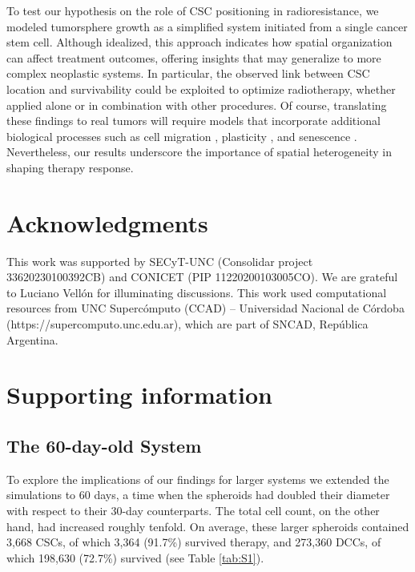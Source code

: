 \documentclass[10pt,letterpaper]{article}
\begin{document}
To test our hypothesis on the role of CSC positioning in radioresistance, we modeled tumorsphere growth as a simplified system initiated from a single cancer stem cell. Although idealized, this approach indicates how spatial organization can affect treatment outcomes, offering insights that may generalize to more complex neoplastic systems. In particular, the observed link between CSC location and survivability could be exploited to optimize radiotherapy, whether applied alone or in combination with other procedures. Of course, translating these findings to real tumors will require models that incorporate additional biological processes such as cell migration \cite{friedl2010}, plasticity \cite{schniewind2022, meacham2013}, and senescence \cite{gao2013, childs2014}. Nevertheless, our results underscore the importance of spatial heterogeneity \cite{junttila2013, tonello2025} in shaping therapy response.



\section*{Acknowledgments}

This work was supported by SECyT-UNC (Consolidar project 33620230100392CB) and CONICET (PIP 11220200103005CO). We are grateful to Luciano Vellón for illuminating discussions.
This work used computational resources from UNC Supercómputo (CCAD) – Universidad Nacional de Córdoba (https://supercomputo.unc.edu.ar), which are part of SNCAD, República Argentina.





\section*{Supporting information}

\setcounter{figure}{0}
\renewcommand{\thefigure}{S\arabic{figure}}
\setcounter{table}{0}
\renewcommand{\thetable}{S\arabic{table}}
\setcounter{equation}{0}
\renewcommand{\theequation}{S\arabic{equation}}
\setcounter{section}{0}

\subsection*{The 60-day-old System}
To explore the implications of our findings for larger systems we extended the simulations to 60 days, a time when the spheroids had doubled their diameter with respect to their 30-day counterparts. The total cell count, on the other hand, had increased roughly tenfold. On average, these larger spheroids contained 3,668 CSCs, of which 3,364 (91.7\%) survived therapy, and 273,360 DCCs, of which 198,630 (72.7\%) survived (see Table \ref{tab:S1}).
\end{document}
